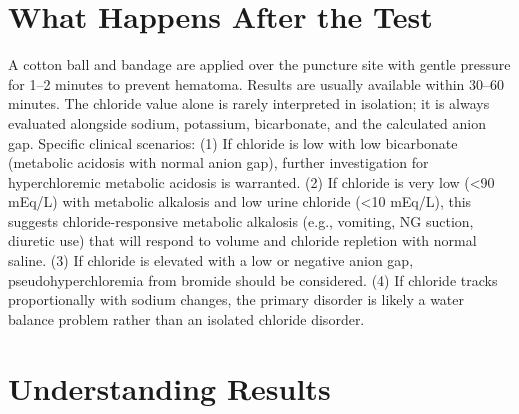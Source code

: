 \section*{What Happens After the Test}
A cotton ball and bandage are applied over the puncture site with gentle pressure for 1--2 minutes to prevent hematoma. Results are usually available within 30--60 minutes. The chloride value alone is rarely interpreted in isolation; it is always evaluated alongside sodium, potassium, bicarbonate, and the calculated anion gap. Specific clinical scenarios: (1) If chloride is low with low bicarbonate (metabolic acidosis with normal anion gap), further investigation for hyperchloremic metabolic acidosis is warranted. (2) If chloride is very low (<90 mEq/L) with metabolic alkalosis and low urine chloride (<10 mEq/L), this suggests chloride-responsive metabolic alkalosis (e.g., vomiting, NG suction, diuretic use) that will respond to volume and chloride repletion with normal saline. (3) If chloride is elevated with a low or negative anion gap, pseudohyperchloremia from bromide should be considered. (4) If chloride tracks proportionally with sodium changes, the primary disorder is likely a water balance problem rather than an isolated chloride disorder.

\section*{Understanding Results}

